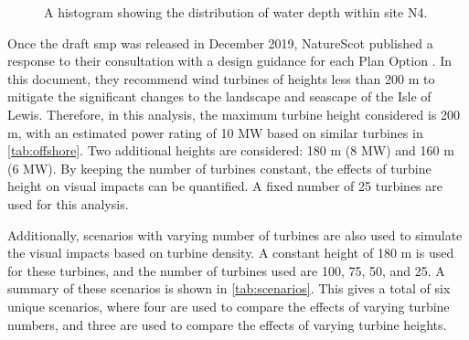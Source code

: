 \begin{figure}
  \centering
  \caption{A histogram showing the distribution of water depth within site N4. \label{fig:hist}}
\end{figure}

Once the draft \gls{smp} was released in December 2019, NatureScot published a response to their consultation with a design guidance for each Plan Option \autocite{naturescot-smp}. In this document, they recommend wind turbines of heights less than 200 m to mitigate the significant changes to the landscape and seascape of the Isle of Lewis. Therefore, in this analysis, the maximum turbine height considered is 200 m, with an estimated power rating of 10 MW based on similar turbines in \autoref{tab:offshore}. Two additional heights are considered: 180 m (8 MW) and 160 m (6 MW). By keeping the number of turbines constant, the effects of turbine height on visual impacts can be quantified. A fixed number of 25 turbines are used for this analysis.

Additionally, scenarios with varying number of turbines are also used to simulate the visual impacts based on turbine density. A constant height of 180 m is used for these turbines, and the number of turbines used are 100, 75, 50, and 25. A summary of these scenarios is shown in \autoref{tab:scenarios}. This gives a total of six unique scenarios, where four are used to compare the effects of varying turbine numbers, and three are used to compare the effects of varying turbine heights.

